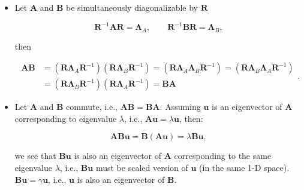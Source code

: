 \documentclass[10pt,b5paper,titlepage]{book}
\begin{document}
\begin{itemize}
    \item Let $\mathbf{A}$ and $\mathbf{B}$ be simultaneously diagonalizable
        by $\mathbf{R}$

        \begin{equation}
            \mathbf{R}^{-1}\mathbf{A}\mathbf{R} = \mathbf{\Lambda}_{A}
            , \qquad
            \mathbf{R}^{-1}\mathbf{B}\mathbf{R} = \mathbf{\Lambda}_{B}
        ,\end{equation}

        then

        \begin{equation}
            \begin{array}{ll}
                \mathbf{A}\mathbf{B}
                &= (\mathbf{R}\mathbf{\Lambda}_{A}\mathbf{R}^{-1})
                (\mathbf{R}\mathbf{\Lambda}_{B}\mathbf{R}^{-1})
                = (\mathbf{R}\mathbf{\Lambda}_{A}\mathbf{\Lambda}_{B}\mathbf{R}^{-1})
                = (\mathbf{R}\mathbf{\Lambda}_{B}\mathbf{\Lambda}_{A}\mathbf{R}^{-1})
                \\
                &= (\mathbf{R}\mathbf{\Lambda}_{B}\mathbf{R}^{-1})
                (\mathbf{R}\mathbf{\Lambda}_{A}\mathbf{R}^{-1})
                = \mathbf{B}\mathbf{A}
            \end{array}
        .\end{equation}

    \item Let $\mathbf{A}$ and $\mathbf{B}$ commute, i.e.,
        $\mathbf{A}\mathbf{B} = \mathbf{B}\mathbf{A}$. Assuming $\mathbf{u}$ is
        an eigenvector of $\mathbf{A}$ corresponding to eigenvalue $\lambda$,
        i.e., $\mathbf{A}\mathbf{u} = \lambda \mathbf{u}$, then:

        \begin{equation}
            \mathbf{A}\mathbf{B}\mathbf{u} = \mathbf{B}(\mathbf{A}\mathbf{u})
            = \lambda \mathbf{B}\mathbf{u}
        ,\end{equation}

        we see that $\mathbf{B}\mathbf{u}$ is also an eigenvector of $\mathbf{A}$
        corresponding to the same eigenvalue $\lambda$, i.e., $\mathbf{B}\mathbf{u}$
        must be scaled version of $\mathbf{u}$ (in the same 1-D space).
        $\mathbf{B}\mathbf{u} = \gamma \mathbf{u}$, i.e., $\mathbf{u}$ is also
        an eigenvector of $\mathbf{B}$.

\end{itemize}
\end{document}
